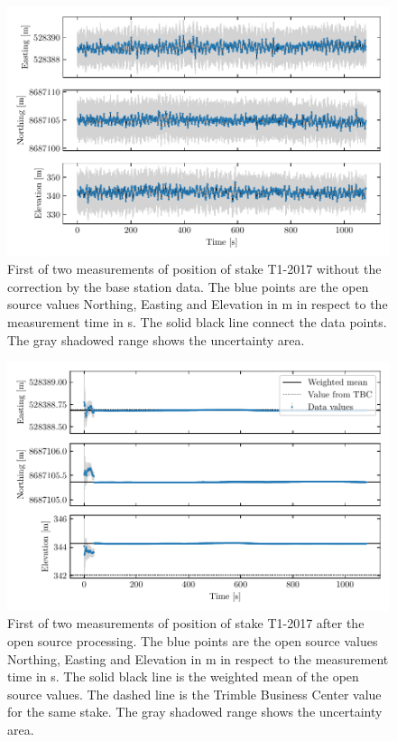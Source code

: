 \begin{figure}[H]
    \centering
    \includegraphics[width=\textwidth]{./figs/timeseries/46250700_org-T1-i-2017_Timeseries-east-north-elev.pdf}
    \caption{First of two measurements of position of stake T1-2017 without the correction by the base station data. The blue points are the open source values Northing, Easting and Elevation in m in respect to the measurement time in s. The solid black line connect the data points. The gray shadowed range shows the uncertainty area.}
    \label{GPS:fig:T1-i_nocorr}
\end{figure}

\begin{figure}[H]
    \centering
    \includegraphics[width=\textwidth]{./figs/timeseries/46250700_corr-T1-i-2017_Timeseries-east-north-elev.pdf}
    \caption{First of two measurements of position of stake T1-2017 after the open source processing. The blue points are the open source values Northing, Easting and Elevation in m in respect to the measurement time in s. The solid black line is the weighted mean of the open source values. The dashed line is the Trimble Business Center value for the same stake. The gray shadowed range shows the uncertainty area.}
    \label{GPS:fig:T1-i_timeseries}
\end{figure}

